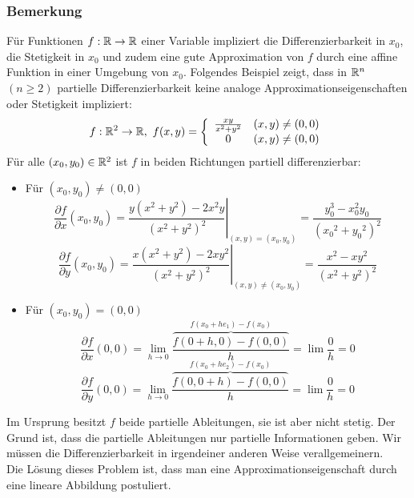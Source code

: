 \subsubsection*{Bemerkung}
Für Funktionen $f:\mathbb{R}\to\mathbb{R}$ einer Variable impliziert die Differenzierbarkeit in $x_0$, die Stetigkeit in $x_0$ und zudem eine gute Approximation von $f$ durch eine affine Funktion in einer Umgebung von $x_0$. Folgendes Beispiel zeigt, dass in $\mathbb{R}^n$ $(n\geq 2)$ partielle Differenzierbarkeit keine analoge Approximationseigenschaften oder Stetigkeit impliziert:
\[f: \R^2 \to\R ,{\text{ }}f(x,y) = \left\{ {\begin{array}{*{20}{c}}
{\frac{{xy}}{{{x^2} + {y^2}}}}&{(x,y)\not  = (0,0)}\\
0&{(x,y)\not  = (0,0)}
\end{array}} \right.\]
Für alle $\left( x_0,y_0\right) \in\mathbb{R}^2$ ist $f$ in beiden Richtungen partiell differenzierbar:
\begin{itemize}
\item Für $\left( x_0,y_0\right)\not=\left( 0,0\right)$ \[\frac{{\partial f}}{{\partial x}}\left( {{x_0},{y_0}} \right) = {\left. {\frac{{y\left( {{x^2} + {y^2}} \right) - 2{x^2}y}}{{{{\left( {{x^2} + {y^2}} \right)}^2}}}} \right|_{(x,y) = \left( {{x_0},{y_0}} \right)}} = \frac{{y_0^3 - x_0^2{y_0}}}{{{{\left( {{x_0}^2 + {y_0}^2} \right)}^2}}}\]
\[\frac{{\partial f}}{{\partial y}}\left( {{x_0},{y_0}} \right) = {\left. {\frac{{x\left( {{x^2} + {y^2}} \right) - 2x{y^2}}}{{{{\left( {{x^2} + {y^2}} \right)}^2}}}} \right|_{(x,y)\not  = \left( {{x_0},{y_0}} \right)}} = \frac{{{x^2} - x{y^2}}}{{{{\left( {{x^2} + {y^2}} \right)}^2}}}\]
\item Für $\left(x_0,y_0\right)=\left( 0,0\right)$\[\frac{{\partial f}}{{\partial x}}(0,0) = \mathop {\lim }\limits_{h \to 0} \frac{{\overbrace {f\left( {0 + h,0} \right) - f\left( {0,0} \right)}^{f({x_0} + h{e_1}) - f(x_0)}}}{h} = \lim \frac{0}{h} = 0\]\[\frac{{\partial f}}{{\partial y}}(0,0) = \mathop {\lim }\limits_{h \to 0} \frac{{\overbrace {f\left( {0,0 + h} \right) - f\left( {0,0} \right)}^{f({x_0} + h{e_2}) - f({x_0})}}}{h} = \lim \frac{0}{h} = 0\]
\end{itemize}
Im Ursprung besitzt $f$ beide partielle Ableitungen, sie ist aber nicht stetig. Der Grund ist, dass die partielle Ableitungen nur partielle Informationen geben. Wir müssen die Differenzierbarkeit in irgendeiner anderen Weise verallgemeinern.\\

Die Lösung dieses Problem ist, dass man eine Approximationseigenschaft durch eine lineare Abbildung postuliert. \\

